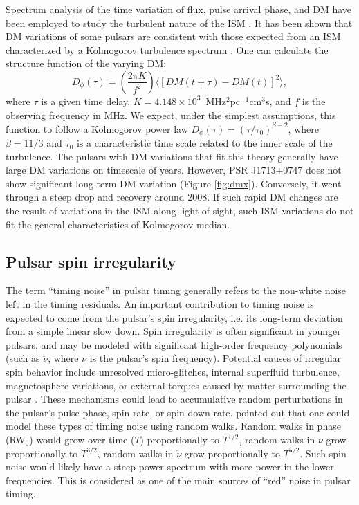 Spectrum analysis of the time variation of flux, pulse arrival phase, and DM have 
been employed to study the turbulent nature of the ISM \citep[e.g.,][]{cpl86, rl90}.
It has been shown that DM variations of some pulsars are consistent with
those expected from an ISM characterized by a Kolmogorov turbulence spectrum
\citep{cwd+90, ric90, ktr94, yhc+07, kcs+13, fst14}. One can calculate the 
structure function of the varying DM: 
\begin{equation}
D_{\phi}(\tau)=\left(\frac{2\pi K}{f^2}\right)\langle [DM(t+\tau)-DM(t)]^2\rangle, 
\end{equation}
where $\tau$ 
is a given time delay, $K=4.148\times10^3$~MHz$^2$pc$^{-1}$cm$^3$s, and $f$ is 
the observing frequency in MHz. We expect, under the simplest assumptions, 
this function to follow a Kolmogorov power law $D_{\phi}(\tau)=(\tau/\tau_0)^{\beta -2}$, 
where $\beta=11/3$ and $\tau_0$ is a characteristic time scale related to 
the inner scale of the turbulence. The pulsars with DM variations that fit this
theory generally have large DM variations on timescale of 
years. However, PSR J1713+0747 does not show significant long-term DM variation 
(Figure \ref{fig:dmx}). Conversely, it went through a steep drop and recovery 
around 2008. If such rapid DM changes are the result of variations in the ISM along
light of sight, such ISM variations do not fit the general characteristics of Kolmogorov median. 


\subsection{Pulsar spin irregularity}
\label{sec:spin}

The term ``timing noise'' in pulsar timing generally refers to the non-white
noise left in the timing residuals.
An important contribution to timing noise is expected to come from the pulsar's spin
irregularity, i.e. its long-term deviation from a simple linear slow down. 
Spin irregularity is often significant in younger pulsars, and 
may be modeled with significant high-order frequency polynomials (such as $\ddot{\nu}$, where $\nu$ is the pulsar's spin frequency). 
Potential causes of irregular spin behavior include unresolved
micro-glitches, internal superfluid turbulence, magnetosphere variations, or external torques caused by matter surrounding the pulsar \citep{hlk10, ymh+13, ml14}.
These mechanisms could lead to accumulative random perturbations in the 
pulsar's pulse phase, spin rate, or spin-down rate. 
\citet{sc10} pointed out that one could model these types of timing noise using random walks.
Random walks in phase (RW$_0$) would grow over time ($T$)
proportionally to $T^{1/2}$, random walks in $\nu$ grow proportionally to
$T^{3/2}$, random walks in
$\dot{\nu}$ grow proportionally to $T^{5/2}$.
Such spin noise would likely have a steep power spectrum with more power in
the lower frequencies. This
is considered as one of the main sources of ``red'' noise in pulsar timing.


